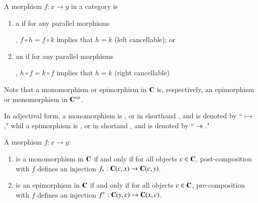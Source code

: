 \begin{definition}
    A morphism $f:x\rightarrow y$ in a category is \begin{enumerate}
        \item a  if for any parallel morphisms , $f\circ h = f\circ k$ implies that $h = k$ (left cancellable); or
        \item an  if for any parallel morphisms , $h\circ f = k\circ f$ implies that $h = k$ (right cancellable)
    \end{enumerate}
\end{definition}

\begin{remark}
    Note that a monomorphism or epimorphism in $\normalfont\textbf{C}$ is, respectively, an epimorphism or monomorphism in $\normalfont\textbf{C}^{op}$.
\end{remark}

\begin{note}
    In adjectival form, a monomorphism is , or in shorthand , and is denoted by ``$\rightarrowtail$," whil a epimorphism is , or in shortand , and is denoted by ``$\twoheadrightarrow$."
\end{note}

\begin{definition}
    A morphism $f:x\rightarrow y$:\begin{enumerate}
        \item is a monomorphism in $\normalfont\textbf{C}$ if and only if for all objects $c \in \normalfont\textbf{C}$, post-composition with $f$ defines an injection $f_*:\normalfont\textbf{C}(c,x)\rightarrow \normalfont\textbf{C}(c,y)$.
        \item is an epimorphism in $\normalfont\textbf{C}$ if and only if for all objects $c \in \normalfont\textbf{C}$, pre-composition with $f$ defines an injection $f^*:\normalfont\textbf{C}(y,c)\rightarrow \normalfont\textbf{C}(x,c)$.
    \end{enumerate}
\end{definition}

